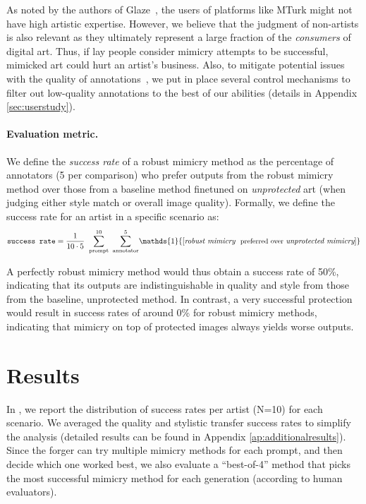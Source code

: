 \documentclass{article}
\begin{document}
As noted by the authors of Glaze~\citep{glaze}, the users of platforms like 
MTurk might not have high artistic expertise. However, we believe that the judgment of non-artists is also relevant as they ultimately represent a large fraction of the \emph{consumers} of digital art. Thus, if lay people consider mimicry attempts to be successful, mimicked art could hurt an artist's business. Also, to mitigate potential issues with the quality of annotations~\citep{kennedy2020shape}, we put in place several control mechanisms to filter out low-quality annotations to the best of our abilities (details in Appendix \ref{sec:userstudy}).




\paragraph{Evaluation metric.} We define the \emph{success rate} of a robust mimicry method as the percentage of annotators (5 per comparison) who prefer outputs from the robust mimicry method over those from a baseline method finetuned on \emph{unprotected} art (when judging either style match or overall image quality). Formally, we define the success rate for an artist in a specific scenario as:
\begin{equation}
\label{eq:success}
 \texttt{success rate} = \frac{1}{{\color{black} 10} \cdot {\color{black} 5}} \; \; {\color{black}\sum_{\text{prompt}}^{10}} \hspace{0.5em}{\color{black}\sum_{\text{annotator}}^5} \mathds{1}{[\textit{robust mimicry} \text{ \small{preferred over} } \textit{unprotected mimicry}]}
\end{equation}

A perfectly robust mimicry method would thus obtain a success rate of 50\%, indicating that its outputs are indistinguishable in quality and style from those from the baseline, unprotected method. In contrast, a very successful protection would result in success rates of around 0\% for robust mimicry methods, indicating that mimicry on top of protected images always yields worse outputs.

\section{Results}
\label{sec:results}


In , we report the distribution of success rates per artist (N=10) for each scenario. We averaged the quality and stylistic transfer success rates to simplify the analysis (detailed results can be found in Appendix \ref{ap:additionalresults}). Since the forger can try multiple mimicry methods for each prompt, and then decide which one worked best, we also evaluate a ``best-of-4'' method that picks the most successful mimicry method for each generation (according to human evaluators).
\end{document}
